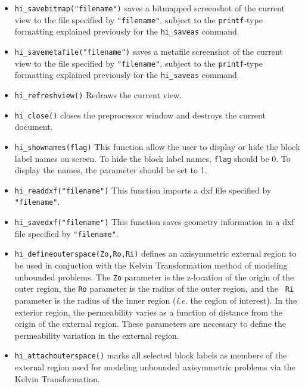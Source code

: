 \begin{itemize}
\item \texttt{hi\_savebitmap("filename")} saves a bitmapped screenshot of the current
view to the file specified by \texttt{"filename"}, subject to the
\texttt{printf}-type formatting explained previously for the
\texttt{hi\_saveas} command.

\item \texttt{hi\_savemetafile("filename")} saves a metafile screenshot of the current
view to the file specified by \texttt{"filename"}, subject to the
\texttt{printf}-type formatting explained previously for the
\texttt{hi\_saveas} command.

\item \texttt{hi\_refreshview()} Redraws the current view.

\item \texttt{hi\_close()} closes the preprocessor window and
destroys the current document.

\item \texttt{hi\_shownames(flag)} This function allow the user to display or hide the
block label names on screen. To hide the block label names,
\texttt{flag} should be 0. To display the names, the parameter
should be set to 1.

\item{\tt hi\_readdxf("filename")} This function imports a dxf file specified by {\tt "filename"}.

\item{\tt hi\_savedxf("filename")} This function saves geometry information in a dxf file specified by {\tt "filename"}.

\item{\tt hi\_defineouterspace(Zo,Ro,Ri)} defines
an axisymmetric external region to be used in conjuction with the
Kelvin Transformation method of modeling unbounded problems.  The
{\tt Zo} parameter is the z-location of the origin of the outer region,
the {\tt Ro} parameter is the radius of the outer region, and the {\tt
Ri} parameter is the radius of the inner region ({\em i.e.} the region of
interest). In the exterior region, the permeability varies as a function of
distance from the origin of the external region.  These parameters
are necessary to define the permeability variation in the external
region.

\item{\tt hi\_attachouterspace()} marks all
selected block labels as members of the external region used for
modeling unbounded axisymmetric problems via the Kelvin
Transformation.


\end{itemize}
